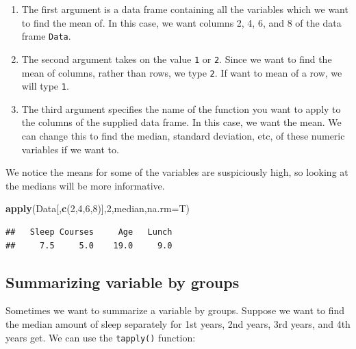 \documentclass[
]{book}
\newenvironment{Shaded}{\begin{snugshade}}{\end{snugshade}}
\newcommand{\AttributeTok}[1]{\textcolor[rgb]{0.13,0.29,0.53}{#1}}
\newcommand{\DecValTok}[1]{\textcolor[rgb]{0.00,0.00,0.81}{#1}}
\newcommand{\FunctionTok}[1]{\textcolor[rgb]{0.13,0.29,0.53}{\textbf{#1}}}
\newcommand{\NormalTok}[1]{#1}
\newcommand{\SpecialCharTok}[1]{\textcolor[rgb]{0.81,0.36,0.00}{\textbf{#1}}}
\begin{document}
\begin{enumerate}
\def\labelenumi{\arabic{enumi}.}
\item
  The first argument is a data frame containing all the variables which we want to find the mean of. In this case, we want columns 2, 4, 6, and 8 of the data frame \texttt{Data}.
\item
  The second argument takes on the value \texttt{1} or \texttt{2}. Since we want to find the mean of columns, rather than rows, we type \texttt{2}. If want to mean of a row, we will type \texttt{1}.
\item
  The third argument specifies the name of the function you want to apply to the columns of the supplied data frame. In this case, we want the mean. We can change this to find the median, standard deviation, etc, of these numeric variables if we want to.
\end{enumerate}

We notice the means for some of the variables are suspiciously high, so looking at the medians will be more informative.

\begin{Shaded}
\begin{Highlighting}[]
\FunctionTok{apply}\NormalTok{(Data[,}\FunctionTok{c}\NormalTok{(}\DecValTok{2}\NormalTok{,}\DecValTok{4}\NormalTok{,}\DecValTok{6}\NormalTok{,}\DecValTok{8}\NormalTok{)],}\DecValTok{2}\NormalTok{,median,}\AttributeTok{na.rm=}\NormalTok{T)}
\end{Highlighting}
\end{Shaded}

\begin{verbatim}
##   Sleep Courses     Age   Lunch 
##     7.5     5.0    19.0     9.0
\end{verbatim}

\hypertarget{summarizing-variable-by-groups}{%
\subsection{Summarizing variable by groups}\label{summarizing-variable-by-groups}}

Sometimes we want to summarize a variable by groups. Suppose we want to find the median amount of sleep separately for 1st years, 2nd years, 3rd years, and 4th years get. We can use the \texttt{tapply()} function:

\begin{Shaded}
\end{Shaded}
\end{document}
